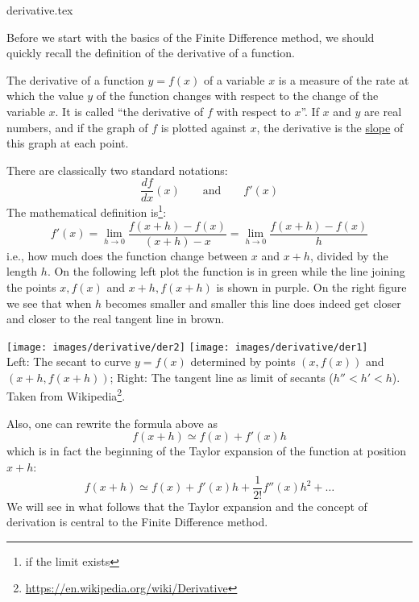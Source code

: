\begin{flushright} {\tiny {\color{gray} derivative.tex}} \end{flushright}

Before we start with the basics of the Finite Difference method, we should quickly recall the definition 
of the derivative of a function. 

\begin{displayquote}
The derivative of a function $y=f(x)$ of a variable $x$ is a measure of the rate at which 
the value $y$ of the function changes with respect to the change of the variable $x$. It is 
called ``the derivative of $f$ with respect to $x$''. If $x$ and $y$ are real numbers, and 
if the graph of $f$ is plotted against $x$, the derivative is the \underline{slope} of this 
graph at each point. 
\end{displayquote}

\noindent There are classically two standard notations:
\begin{equation}
\frac{df}{dx}(x) \qquad \text{and} \qquad f'(x)
\end{equation}
The mathematical definition is\footnote{if the limit exists}:
\begin{equation}
\boxed{
f'(x)
=\lim_{h\rightarrow 0} \frac{f(x+h)-f(x)}{(x+h)-x} 
=\lim_{h\rightarrow 0} \frac{f(x+h)-f(x)}{h} 
}
\end{equation}
i.e., how much does the function change between $x$ and $x+h$, divided by the length $h$.
On the following left plot the function is in green while the line joining the points
$x,f(x)$ and $x+h,f(x+h)$ is shown in purple. On the right figure we see that 
when $h$ becomes smaller and smaller this line does indeed get closer and closer 
to the real tangent line in brown.

\begin{center}
\texttt{[image: images/derivative/der2]}
\texttt{[image: images/derivative/der1]}\\
{\captionfont 
Left: The secant to curve $y=f(x)$ determined by points $(x,f(x))$ and $(x+h, f(x+h))$;
Right: The tangent line as limit of secants ($h''<h'<h$).
Taken from Wikipedia\footnote{\url{https://en.wikipedia.org/wiki/Derivative}}.
}
\end{center}

\noindent Also, one can rewrite the formula above as
\begin{equation}
f(x+h) \simeq f(x) +  f'(x) h
\end{equation}
which is in fact the beginning of the Taylor expansion of the function at position $x+h$:
\begin{equation}
f(x+h) \simeq f(x) +  f'(x) h + \frac{1}{2!} f''(x) h^2 + \dots 
\end{equation}
We will see in what follows that the Taylor expansion and the concept of derivation is 
central to the Finite Difference method. 

